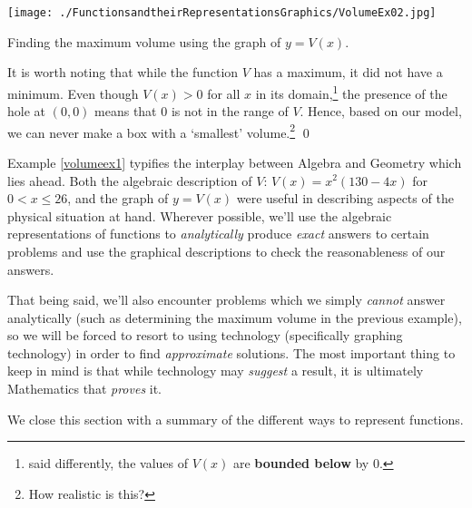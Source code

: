 \begin{ex}
\begin{enumerate}
\begin{center}

\texttt{[image: ./FunctionsandtheirRepresentationsGraphics/VolumeEx02.jpg]} 

Finding the maximum volume using the graph of $y = V(x)$.

\end{center}

\pagebreak

It is worth noting that while the function $V$ has a maximum, it did not have a minimum.  Even though $V(x)>0$ for all $x$ in its domain,\footnote{said differently, the values of $V(x)$ are \textbf{bounded below} by $0$.} the presence of the hole at $(0,0)$ means that $0$ is not in the range of $V$.  Hence, based on our model, we can never make a box with a  `smallest' volume.\footnote{How realistic is this?}  \qed

\end{enumerate}
\end{ex}

\medskip

Example \ref{volumeex1} typifies the interplay between Algebra and Geometry which lies ahead.  Both the algebraic description of  $V$: $V(x) = x^2 (130 - 4x)$ for $0 < x \leq 26$, and the graph of $y=V(x)$ were useful in describing aspects of the physical situation at hand.  Wherever possible, we'll use the algebraic representations of functions to \textit{analytically} produce \textit{exact} answers to certain problems and use the graphical descriptions to check the reasonableness of our answers. 

\medskip

That being said, we'll also encounter problems which we simply \textit{cannot} answer analytically (such as determining the maximum volume in the previous example), so we will be forced to resort to using technology (specifically graphing technology) in order to find \textit{approximate} solutions.  The most important thing to keep in mind is that while technology may \textit{suggest} a result, it is ultimately Mathematics that \textit{proves} it. 

\medskip

We close this section with a summary of the different ways to represent functions.

